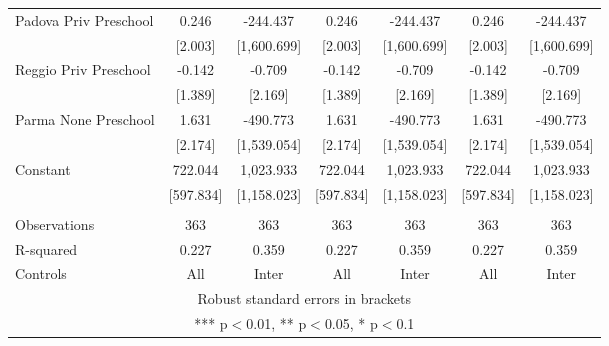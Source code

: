 \begin{tabular}{lcccccc}
Padova Priv Preschool & 0.246 & -244.437 & 0.246 & -244.437 & 0.246 & -244.437 \\
 & [2.003] & [1,600.699] & [2.003] & [1,600.699] & [2.003] & [1,600.699] \\
Reggio Priv Preschool & -0.142 & -0.709 & -0.142 & -0.709 & -0.142 & -0.709 \\
 & [1.389] & [2.169] & [1.389] & [2.169] & [1.389] & [2.169] \\
Parma None Preschool & 1.631 & -490.773 & 1.631 & -490.773 & 1.631 & -490.773 \\
 & [2.174] & [1,539.054] & [2.174] & [1,539.054] & [2.174] & [1,539.054] \\
Constant & 722.044 & 1,023.933 & 722.044 & 1,023.933 & 722.044 & 1,023.933 \\
 & [597.834] & [1,158.023] & [597.834] & [1,158.023] & [597.834] & [1,158.023] \\
 &  &  &  &  &  &  \\
Observations & 363 & 363 & 363 & 363 & 363 & 363 \\
R-squared & 0.227 & 0.359 & 0.227 & 0.359 & 0.227 & 0.359 \\
 Controls & All & Inter & All & Inter & All & Inter \\ \hline
\multicolumn{7}{c}{ Robust standard errors in brackets} \\
\multicolumn{7}{c}{ *** p$<$0.01, ** p$<$0.05, * p$<$0.1} \\
\end{tabular}
